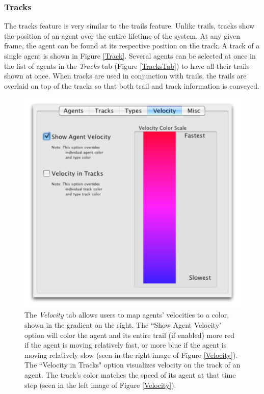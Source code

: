\documentclass[conference]{IEEEtran}
\begin{document}
\subsubsection{Tracks}

The tracks feature is very similar to the trails feature. Unlike trails, tracks show the position of an agent over the entire
lifetime of the system. At any given frame, the agent can be found at its respective position on the track.
A track of a single agent is shown in Figure \ref{Track}.
Several agents can be selected at once in the list of agents in the \textit{Tracks} tab (Figure \ref{TracksTab}) to
have all their trails shown at once.
When tracks are used in conjunction with trails, the trails are overlaid on top of the tracks so that
both trail and track information is conveyed.





\begin{figure}
\centering
\includegraphics[scale=.5]{images/velocitytab.pdf}
\caption{
The \textit{Velocity} tab allows users to map agents' velocities to a color, shown in the gradient on the right.
The ``Show Agent Velocity" option will color the agent and its entire trail (if enabled) more red if the agent is moving relatively fast,
or more blue if the agent is moving relatively slow (seen in the right image of Figure \ref{Velocity}).
The ``Velocity in Tracks" option visualizes velocity on the track of an agent.
The track's color matches the speed of its agent at that time step (seen in the left image of Figure \ref{Velocity}).}
\label{VelocityTab}
\end{figure}
\end{document}
